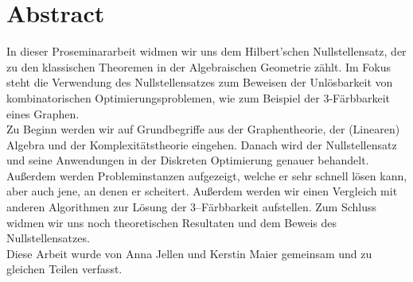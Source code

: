 \vspace*{0.2cm}\section*{Abstract}
In dieser Proseminararbeit widmen wir uns dem Hilbert'schen Nullstellensatz, der zu den klassischen Theoremen in der Algebraischen Geometrie zählt. Im Fokus steht die Verwendung des Nullstellensatzes zum Beweisen der Unlösbarkeit von kombinatorischen Optimierungsproblemen, wie zum Beispiel der 3-Färbbarkeit eines Graphen. \\

\noindent Zu Beginn werden wir auf Grundbegriffe aus der Graphentheorie, der (Linearen) Algebra und der Komplexitätstheorie eingehen. Danach wird der Nullstellensatz und seine Anwendungen in der Diskreten Optimierung genauer behandelt. Außerdem werden Probleminstanzen aufgezeigt, welche er sehr schnell lösen kann, aber auch jene, an denen er scheitert. Außerdem werden wir einen Vergleich mit anderen Algorithmen zur Lösung der 3--Färbbarkeit aufstellen. Zum Schluss widmen wir uns noch theoretischen Resultaten und dem Beweis des Nullstellensatzes. \\

\noindent Diese Arbeit wurde von Anna Jellen und Kerstin Maier gemeinsam und zu gleichen Teilen verfasst.

